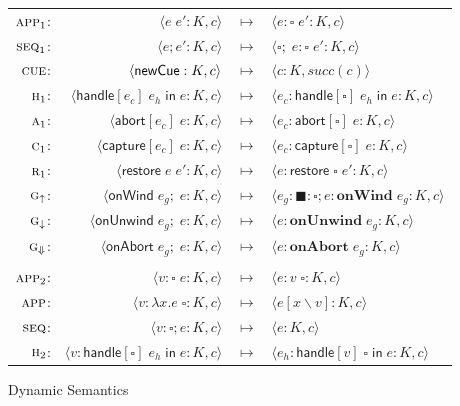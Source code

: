 \documentclass[11pt]{article}
\newcommand{\tuple}[1]{\langle{}{#1}\rangle{}}
\newcommand{\newhandler}{\textsf{newCue}}
\newcommand{\handle}[3]{\textsf{handle}[#1]\;#2\;\textsf{in}\;#3}
\newcommand{\abort}[2]{\textsf{abort}[#1]\;#2}
\newcommand{\capture}[2]{\textsf{capture}[#1]\;#2}
\newcommand{\pushSubcont}[2]{\textsf{restore}\;#1\;#2}
\newcommand{\onWind}[2]{\textsf{onWind}\;#1;\;#2}
\newcommand{\onUnwind}[2]{\textsf{onUnwind}\;#1;\;#2}
\newcommand{\onAbort}[2]{\textsf{onAbort}\;#1;\;#2}
\begin{document}
\begin{figure}[h!]
\caption{Dynamic Semantics}
\label{dynamics}

\begin{center}\fbox{$\tuple{K,c} \longmapsto \tuple{K,c}$}\end{center}

\begin{tabular}{rrcl}
$\textsc{app}_1$: & $\tuple{e\;e' : K,c}$ & $\longmapsto$ & $\tuple{e : \square\;e' : K,c}$ \\
$\textsc{seq}_1$: & $\tuple{e;e' : K,c}$ & $\longmapsto$ & $\tuple{\square;\;e : \square\;e' : K,c}$ \\
$\textsc{cue}$: & $\tuple{\textsf{\newhandler} : K,c}$ & $\longmapsto$ & $\tuple{c : K,succ(c)}$ \\
$\textsc{h}_1$: & $\tuple{\handle{e_c}{e_h}{e} : K,c}$ & $\longmapsto$ & $\tuple{e_c : \handle{\square}{e_h}{e} : K,c}$ \\
$\textsc{a}_1$: & $\tuple{\abort{e_c}{e} : K,c}$ & $\longmapsto$ & $\tuple{e_c : \abort{\square}{e} : K,c}$ \\
$\textsc{c}_1$: & $\tuple{\capture{e_c}{e} : K,c}$ & $\longmapsto$ & $\tuple{e_c : \capture{\square}{e} : K,c}$ \\
$\textsc{r}_1$: & $\tuple{\pushSubcont{e}{e'} : K,c}$ & $\longmapsto$ & $\tuple{e : \pushSubcont{\square}{e'} : K,c}$ \\
$\textsc{g}_\uparrow$: & $\tuple{\onWind{e_g}{e} : K,c}$ & $\longmapsto$ & $\tuple{e_g : \blacksquare : \square; e : \textbf{onWind}\;e_g : K,c}$ \\
$\textsc{g}_\downarrow$: & $\tuple{\onUnwind{e_g}{e} : K,c}$ & $\longmapsto$ & $\tuple{e : \textbf{onUnwind}\;e_g : K,c}$ \\
$\textsc{g}_\Downarrow$: & $\tuple{\onAbort{e_g}{e} : K,c}$ & $\longmapsto$ & $\tuple{e : \textbf{onAbort}\;e_g : K,c}$ \\
\\
$\textsc{app}_2$: & $\tuple{v : \square\;e : K,c}$ & $\longmapsto$ & $\tuple{e : v\;\square : K,c}$ \\
$\textsc{app}$: & $\tuple{v : \lambda x.e\;\square : K,c}$ & $\longmapsto$ & $\tuple{e[x\backslash v] : K,c}$ \\
$\textsc{seq}$: & $\tuple{v : \square;e : K,c}$ & $\longmapsto$ & $\tuple{e : K,c}$ \\
$\textsc{h}_2$: & $\tuple{v : \handle{\square}{e_h}{e} : K,c}$ & $\longmapsto$ & $\tuple{ e_h : \handle{v}{\square}{e} : K,c}$ \\

\end{tabular}
\end{figure}
\end{document}
